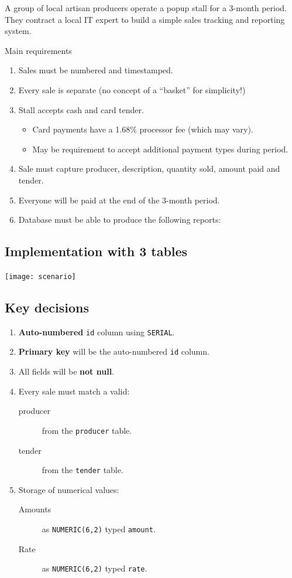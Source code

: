 \documentclass[slides]{pgnotes}
\begin{document}
A group of local artisan producers operate a popup stall for a 3-month period.
They contract a local IT expert to build a simple sales tracking and reporting system.

\begin{bluebox}{Main requirements}
  \begin{enumerate}
  \item Sales must be numbered and timestamped.
  \item Every sale is separate (no concept of a ``basket'' for simplicity!)
  \item Stall accepts cash and card tender.
    \begin{itemize}
    \item Card payments have a 1.68\% processor fee (which may vary).
    \item May be requirement to accept additional payment types during period.
    \end{itemize}
  \item Sale must capture producer, description, quantity sold, amount paid and tender.
  \item Everyone will be paid at the end of the 3-month period.
  \item Database must be able to produce the following reports:
  \end{enumerate}
\end{bluebox}


\subsection{Implementation with 3 tables}

\begin{center}
\texttt{[image: scenario]}
\end{center}

\subsection{Key decisions}

\begin{enumerate}
\item \textbf{Auto-numbered} \texttt{id} column using \texttt{SERIAL}.
\item \textbf{Primary key} will be the auto-numbered \texttt{id} column.
\item All fields will be \textbf{not null}.
\item Every sale must match a valid:
  \begin{description}
  \item[producer] from the \texttt{producer} table.
  \item[tender] from the \texttt{tender} table.
  \end{description}
\item Storage of numerical values:
  \begin{description}
  \item[Amounts] as \texttt{NUMERIC(6,2)} typed \texttt{amount}.
  \item[Rate] as \texttt{NUMERIC(6,2)} typed \texttt{rate}. 
  \end{description}
\end{enumerate}
\end{document}
